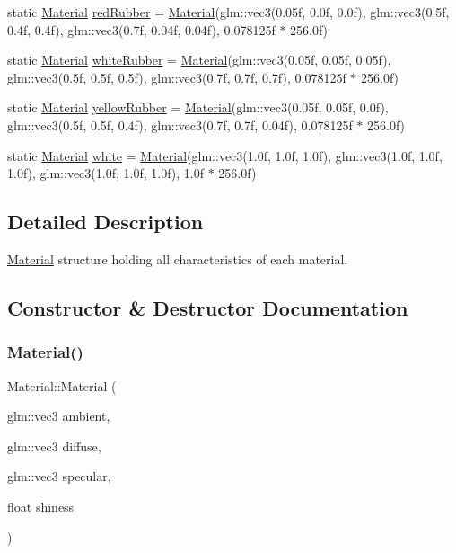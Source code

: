 \begin{DoxyCompactItemize}
\item 
static \mbox{\hyperlink{struct_material}{Material}} \mbox{\hyperlink{struct_material_a5e1b659445c024a24237731f7d35aa52}{red\+Rubber}} = \mbox{\hyperlink{struct_material}{Material}}(glm\+::vec3(0.\+05f, 0.\+0f, 0.\+0f), glm\+::vec3(0.\+5f, 0.\+4f, 0.\+4f), glm\+::vec3(0.\+7f, 0.\+04f, 0.\+04f), 0.\+078125f $\ast$ 256.\+0f)
\item 
static \mbox{\hyperlink{struct_material}{Material}} \mbox{\hyperlink{struct_material_ab84b745e205896377d3f1fc0e3d1246f}{white\+Rubber}} = \mbox{\hyperlink{struct_material}{Material}}(glm\+::vec3(0.\+05f, 0.\+05f, 0.\+05f), glm\+::vec3(0.\+5f, 0.\+5f, 0.\+5f), glm\+::vec3(0.\+7f, 0.\+7f, 0.\+7f), 0.\+078125f $\ast$ 256.\+0f)
\item 
static \mbox{\hyperlink{struct_material}{Material}} \mbox{\hyperlink{struct_material_acc88ba21b8ed41d61c93d7128b7476fc}{yellow\+Rubber}} = \mbox{\hyperlink{struct_material}{Material}}(glm\+::vec3(0.\+05f, 0.\+05f, 0.\+0f), glm\+::vec3(0.\+5f, 0.\+5f, 0.\+4f), glm\+::vec3(0.\+7f, 0.\+7f, 0.\+04f), 0.\+078125f $\ast$ 256.\+0f)
\item 
static \mbox{\hyperlink{struct_material}{Material}} \mbox{\hyperlink{struct_material_a0bce3d9c7e1e38fbf55e85a0104c2564}{white}} = \mbox{\hyperlink{struct_material}{Material}}(glm\+::vec3(1.\+0f, 1.\+0f, 1.\+0f), glm\+::vec3(1.\+0f, 1.\+0f, 1.\+0f), glm\+::vec3(1.\+0f, 1.\+0f, 1.\+0f), 1.\+0f $\ast$ 256.\+0f)
\end{DoxyCompactItemize}


\subsection{Detailed Description}
\mbox{\hyperlink{struct_material}{Material}} structure holding all characteristics of each material. 

\subsection{Constructor \& Destructor Documentation}
\mbox{\label{struct_material_a0be7dba7f259e659502c4b543cdd7d8c}} 
\subsubsection{\texorpdfstring{Material()}{Material()}\hspace{0.1cm}{\footnotesize\ttfamily [1/2]}}
{\footnotesize\ttfamily Material\+::\+Material (\begin{DoxyParamCaption}\item[{glm\+::vec3}]{ambient,  }\item[{glm\+::vec3}]{diffuse,  }\item[{glm\+::vec3}]{specular,  }\item[{float}]{shiness }\end{DoxyParamCaption})\hspace{0.3cm}{\ttfamily [inline]}}



